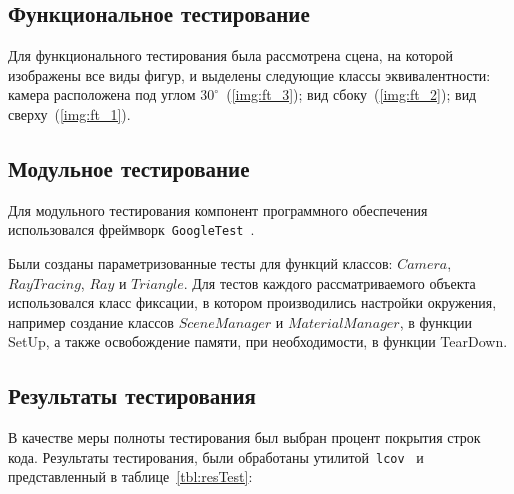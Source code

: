\subsection{Функциональное тестирование}
Для функционального тестирования была рассмотрена сцена, на которой изображены все виды фигур, и выделены следующие классы эквивалентности: камера расположена под углом $30^\circ$~(\ref{img:ft_3}); вид сбоку~(\ref{img:ft_2}); вид сверху~(\ref{img:ft_1}).

\FloatBarrier
{}
\FloatBarrier
{}
\FloatBarrier
{}
\FloatBarrier

\subsection{Модульное тестирование}
Для модульного тестирования компонент программного обеспечения использовался фреймворк~\texttt{GoogleTest}~\cite{gtest}. 

Были созданы параметризованные тесты для функций классов: $Camera$, $RayTracing$, $Ray$ и $Triangle$. Для тестов каждого рассматриваемого объекта использовался класс фиксации, в котором производились настройки окружения, например создание классов $SceneManager$ и $MaterialManager$, в функции SetUp, а также освобождение памяти, при необходимости, в функции TearDown.


\subsection{Результаты тестирования}

В качестве меры полноты тестирования был выбран процент покрытия строк кода. Результаты тестирования, были обработаны утилитой~\texttt{lcov}~\cite{lcov} и представленный в таблице~\ref{tbl:resTest}:

